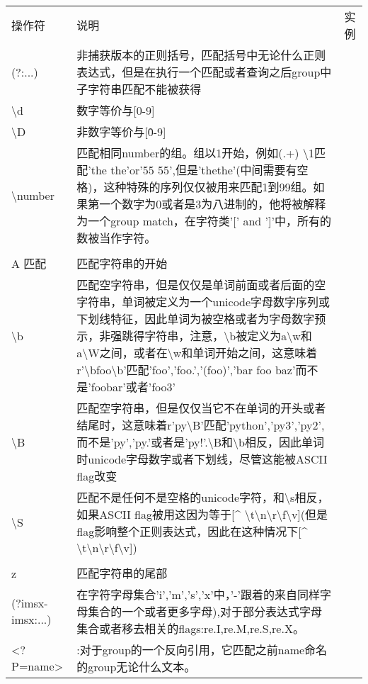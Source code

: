 \begin{center}
\begin{tabular}{|p{2.5cm}|p{8cm}|p{4cm}|}
操作符 & 说明 & 实例\\
(?:...)&非捕获版本的正则括号，匹配括号中无论什么正则表达式，但是在执行一个匹配或者查询之后group中子字符串匹配不能被获得&\\
\hline
\textbackslash d&数字等价与[0-9]&\\
\hline
\textbackslash D&非数字等价与[\^0-9]&\\
\hline
\textbackslash number &匹配相同number的组。组以1开始，例如(.+) \textbackslash1匹配'the the'or'55 55',但是'thethe'(中间需要有空格)，这种特殊的序列仅仅被用来匹配1到99组。如果第一个数字为0或者是3为八进制的，他将被解释为一个group match，在字符类'[' and ']'中，所有的数被当作字符。&\\
\hline
\\A 匹配&匹配字符串的开始\\
\hline
\textbackslash b& 匹配空字符串，但是仅仅是单词前面或者后面的空字符串，单词被定义为一个unicode字母数字序列或下划线特征，因此单词为被空格或者为字母数字预示，非强跳得字符串，注意，\textbackslash b被定义为a\textbackslash w和a\textbackslash W之间，或者在\textbackslash w和单词开始之间，这意味着r'\textbackslash bfoo\textbackslash b'匹配'foo','foo.','(foo)','bar foo baz'而不是'foobar'或者'foo3'&\\
\hline
\textbackslash B &匹配空字符串，但是仅仅当它不在单词的开头或者结尾时，这意味着r'py\textbackslash B'匹配'python','py3','py2',而不是'py','py.'或者是'py!'.\textbackslash B和\textbackslash b相反，因此单词时unicode字母数字或者下划线，尽管这能被ASCII flag改变&\\
\hline
\hline
\textbackslash S&匹配不是任何不是空格的unicode字符，和\textbackslash s相反，如果ASCII flag被用这因为等于[\^{} \textbackslash t\textbackslash n\textbackslash r\textbackslash f\textbackslash v](但是flag影响整个正则表达式，因此在这种情况下[\^{} \textbackslash t\textbackslash n\textbackslash r\textbackslash f\textbackslash v])&\\
\hline
\\z&匹配字符串的尾部&\\
\hline
(?imsx-imsx:...)&在字符字母集合'i','m','s','x'中，'-'跟着的来自同样字母集合的一个或者更多字母),对于部分表达式字母集合或者移去相关的flags:re.I,re.M,re.S,re.X。\\
\hline
<?P=name>&:对于group的一个反向引用，它匹配之前name命名的group无论什么文本。\\
\hline
\end{tabular}
\end{center}
